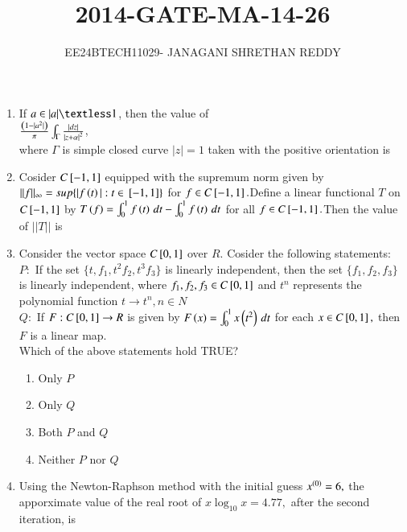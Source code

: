\documentclass[journal]{IEEEtran}
\begin{document}
 


\vspace{3cm}

\title{2014-GATE-MA-14-26}
\author{EE24BTECH11029- JANAGANI SHRETHAN REDDY}
\maketitle{}
\bigskip
\renewcommand{\thefigure}{\theenumi}
\renewcommand{\thetable}{\theenum}
\begin{enumerate}
    \item If $a\in |a| \textless 1$, then the value of\\
    $\frac{\left(1-|a^2|\right)}{\pi}\int_{\Gamma}\frac{|dz|}{{|z+\alpha|}^2}$,\\
    where $\Gamma$ is simple closed curve $|z|=1$ taken with the positive orientation is\\
    \item Cosider $C{}\left[-1,1\right]$ equipped with the supremum norm given by $||f||_{\infty}=sup\{|f\left(t\right)|:t\in {}\left[-1,1\right]\}$ for 
    $f\in C{}\left[-1,1\right].$Define a linear functional $T$ on $C{}\left[-1,1\right]$ by $T\left(f\right)=\int_{0}^{1}f\left(t\right)\,dt-\int_{0}^{1}f\left(t\right)\,dt$ for all $f\in C{}\left[-1,1\right].$Then the value of $||T||$ is\\
    \item Consider the vector space $C{}\left[0,1\right]$ over $R$. Cosider the following statements:\\
    $P:$ If the set $\{t,f_1,t^2f_2,t^3f_3\}$ is linearly independent, then the set $\{f_1,f_2,f_3\}$ is linearly independent, where $f_1,f_2,f_3\in C{}\left[0,1\right]$ and $t^n$ represents the polynomial function $t\rightarrow t^n,n\in N$\\
    $Q:$ If $F:C{}\left[0,1\right]\rightarrow R$ is given by $F\left(x\right)=\int_{0}^{1}x\left(t^2\right)\,dt$ for each $x\in C{}\left[0,1\right],$ then $F$ is a linear map.\\
    Which of the above statements hold TRUE?
    \begin{enumerate}
        \item Only $P$
        \item Only $Q$
        \item Both $P$ and $Q$
        \item Neither $P$ nor $Q$\\
    \end{enumerate}
    \item Using the Newton-Raphson method with the initial guess $x^{\left(0\right)}=6,$ the apporximate value of the real root of $x\log_{10}x=4.77,$ after the second iteration, is\\

\end{enumerate}
\end{document}
